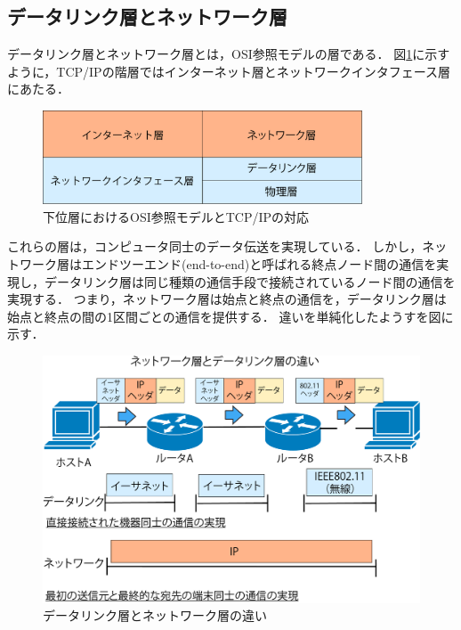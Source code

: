 \documentclass[12pt,a4j,titlepage]{ltjsarticle}
\begin{document}
\subsection{データリンク層とネットワーク層}
データリンク層とネットワーク層とは，OSI参照モデルの層である．
図\ref{fig:kaisou}に示すように，TCP/IPの階層ではインターネット層とネットワークインタフェース層にあたる．
\\
\begin{figure}[h]
\centering
\includegraphics[clip,width=95mm]{figures/kaisou.pdf}
\caption[下位層におけるOSI参照モデルとTCP/IPの対応]{下位層におけるOSI参照モデルとTCP/IPの対応\linebreak}
\label{fig:kaisou}
\end{figure}

これらの層は，コンピュータ同士のデータ伝送を実現している．
しかし，ネットワーク層はエンドツーエンド(end-to-end)と呼ばれる終点ノード間の通信を実現し，データリンク層は同じ種類の通信手段で接続されているノード間の通信を実現する．
つまり，ネットワーク層は始点と終点の通信を，データリンク層は始点と終点の間の1区間ごとの通信を提供する．
違いを単純化したようすを図に示す．

\begin{figure}[h]
\centering
\includegraphics[clip,width=160mm]{figures/data_net.pdf}
\caption[データリンク層とネットワーク層の違い]{データリンク層とネットワーク層の違い\linebreak}
\label{fig:data_net}
\end{figure}
\end{document}
